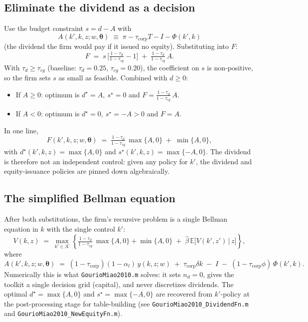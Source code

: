 \documentclass[11pt]{article}
\begin{document}
\subsection{Eliminate the dividend as a decision}
Use the budget constraint $s = d - A$ with
\[
A(k',k,z;w,\boldsymbol{\theta})
\;\equiv\; \pi - \tau_{\text{corp}} T - I - \Phi(k',k)
\]
(the dividend the firm would pay if it issued no equity). Substituting into $F$:
\[
F \;=\; s\,\Big[\tfrac{1-\tau_{d}}{1-\tau_{cg}} - 1\Big] \;+\; \tfrac{1-\tau_{d}}{1-\tau_{cg}}\,A.
\]
With $\tau_{d} \ge \tau_{cg}$ (baseline: $\tau_{d}=0.25$, $\tau_{cg}=0.20$),
the coefficient on $s$ is non-positive, so the firm sets $s$ as small as
feasible. Combined with $d \ge 0$:
\begin{itemize}
  \item If $A \ge 0$: optimum is $d^{\star} = A,\ s^{\star} = 0$ and
        $F = \tfrac{1-\tau_{d}}{1-\tau_{cg}}\,A$.
  \item If $A < 0$: optimum is $d^{\star} = 0,\ s^{\star} = -A > 0$ and $F = A$.
\end{itemize}
In one line,
\[
\boxed{\;F(k',k,z;w,\boldsymbol{\theta})
\;=\; \tfrac{1-\tau_{d}}{1-\tau_{cg}}\,\max\{A,0\} \;+\; \min\{A,0\},\;}
\]
with $d^{\star}(k',k,z) = \max\{A,0\}$ and $s^{\star}(k',k,z) = \max\{-A,0\}$.
The dividend is therefore not an independent control: given any policy for
$k'$, the dividend and equity-issuance policies are pinned down algebraically.

\subsection{The simplified Bellman equation}
After both substitutions, the firm's recursive problem is a single Bellman
equation in $k$ with the single control $k'$:
\[
V(k,z) \;=\; \max_{k' \in \mathcal{K}}\left\{
\tfrac{1-\tau_{d}}{1-\tau_{cg}}\,\max\{A,0\} + \min\{A,0\}
\;+\; \hat{\beta}\,\mathbb{E}\big[V(k',z')\,\big|\,z\big]\right\},
\]
where
\[
A(k',k,z;w,\boldsymbol{\theta})
\;=\; (1-\tau_{\text{corp}})(1-\alpha_l)\,y(k,z;w)
\;+\; \tau_{\text{corp}}\delta k
\;-\; I
\;-\; (1-\tau_{\text{corp}}\phi)\,\Phi(k',k).
\]
Numerically this is what \texttt{GourioMiao2010.m} solves: it sets
$n_{d}=0$, gives the toolkit a single decision grid (capital), and never
discretizes dividends. The optimal $d^{\star} = \max\{A,0\}$ and
$s^{\star} = \max\{-A,0\}$ are recovered from $k'$-policy at the post-processing
stage for table-building (see \texttt{GourioMiao2010\_DividendFn.m} and
\texttt{GourioMiao2010\_NewEquityFn.m}).
\end{document}
